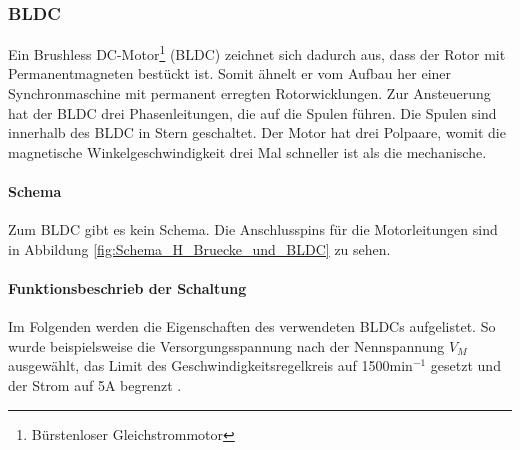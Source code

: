 \subsubsection{BLDC}
\label{subsubsec:BLDC}

Ein Brushless DC-Motor\footnote{Bürstenloser Gleichstrommotor} (BLDC) zeichnet sich dadurch aus, dass der Rotor mit Permanentmagneten bestückt ist. Somit ähnelt er vom Aufbau her einer Synchronmaschine mit permanent erregten Rotorwicklungen. Zur Ansteuerung hat der BLDC drei Phasenleitungen, die auf die Spulen führen. Die Spulen sind innerhalb des BLDC in Stern geschaltet. Der Motor hat drei Polpaare, womit die magnetische Winkelgeschwindigkeit drei Mal schneller ist als die mechanische.

\paragraph{Schema}\mbox{}

Zum BLDC gibt es kein Schema. Die Anschlusspins für die Motorleitungen sind in Abbildung \ref{fig:Schema_H_Bruecke_und_BLDC} zu sehen.

\paragraph{Funktionsbeschrieb der Schaltung}\mbox{}

Im Folgenden werden die Eigenschaften des verwendeten BLDCs aufgelistet. So wurde beispielsweise die Versorgungsspannung nach der Nennspannung $V_M$ ausgewählt, das Limit des Geschwindigkeitsregelkreis auf 1500min$^{-1}$ gesetzt und der Strom auf 5A begrenzt \cite[S.36]{akm_servomotoren_2020}.

